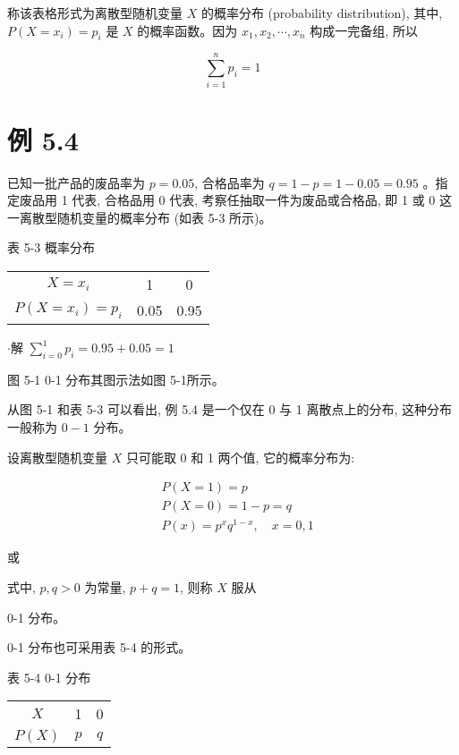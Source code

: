 \documentclass[10pt]{article}
\begin{document}
\begin{CJK*}{UTF8}{bsmi}
称该表格形式为离散型随机变量 $X$ 的概率分布 (probability distribution), 其中, $P\left(X=x_{i}\right)=p_{i}$ 是 $X$ 的概率函数。因为 $x_{1}, x_{2}, \cdots, x_{n}$ 构成一完备组, 所以

$$
\sum_{i=1}^{n} p_{i}=1
$$

\section*{例 5.4}
已知一批产品的废品率为 $p=0.05$, 合格品率为 $q=1-p=1-0.05=0.95$ 。指定废品用 1 代表, 合格品用 0 代表, 考察任抽取一件为废品或合格品, 即 1 或 0 这一离散型随机变量的概率分布 (如表 5-3 所示)。

表 5-3 概率分布

\begin{center}
\begin{tabular}{ccc}
\hline
$X=x_{i}$ & 1 & 0 \\
$P\left(X=x_{i}\right)=p_{i}$ & 0.05 & 0.95 \\
\hline
\end{tabular}
\end{center}

$\cdot$解 $\sum_{i=0}^{1} p_{i}=0.95+0.05=1$

\begin{center}
\end{center}

图 5-1 0-1 分布其图示法如图 5-1所示。

从图 5-1 和表 5-3 可以看出, 例 5.4 是一个仅在 0 与 1 离散点上的分布, 这种分布一般称为 $0-1$ 分布。

设离散型随机变量 $X$ 只可能取 0 和 1 两个值, 它的概率分布为:

$$
\begin{aligned}
& P(X=1)=p \\
& P(X=0)=1-p=q \\
& P(x)=p^{x} q^{1-x}, \quad x=0,1
\end{aligned}
$$

或

式中, $p, q>0$ 为常量, $p+q=1$, 则称 $X$ 服从

0-1 分布。

0-1 分布也可采用表 5-4 的形式。

表 5-4 0-1 分布

\begin{center}
\begin{tabular}{ccc}
\hline
$X$ & 1 & 0 \\
$P(X)$ & $p$ & $q$ \\
\hline
\end{tabular}
\end{center}


\end{CJK*}
\end{document}
